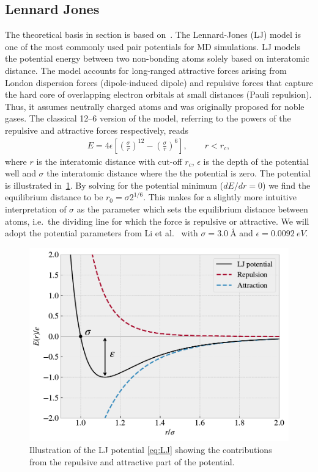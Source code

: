 \subsection{Lennard Jones}\label{sec:LJ}
The theoretical basis in section is based on~\cite{docs_lammps_LJ,
C9CP05445F, chem_libretexts_LJ}. The Lennard-Jones (\acrshort{LJ}) model is one of the most commonly used pair potentials for \acrshort{MD} simulations. \acrshort{LJ} models the potential energy between two non-bonding atoms solely based on interatomic distance. The model accounts for long-ranged attractive forces arising from London dispersion forces (dipole-induced dipole) and repulsive forces that capture the hard core of overlapping electron orbitals at small distances (Pauli repulsion). Thus, it assumes neutrally charged atoms and was originally proposed for noble gases. The classical 12--6 version of the model, referring to the powers of the repulsive and attractive forces respectively, reads
\begin{align}
  E = 4\epsilon \left[\left(\frac{\sigma}{r}\right)^{12} - \left(\frac{\sigma}{r}\right)^6 \right ], \qquad r < r_c,
  \label{eq:LJ}
\end{align}
where $r$ is the interatomic distance with cut-off $r_c$, $\epsilon$ is the
depth of the potential well and $\sigma$ the interatomic distance where the
the potential is zero. The potential is illustrated in~\cref{fig:LJ_pot}. By solving for the potential minimum ($dE/dr = 0$) we find the equilibrium distance to be $r_0 = \sigma 2^{1/6}$. This makes for a slightly more intuitive interpretation of $\sigma$ as the parameter which sets the equilibrium distance between atoms, i.e.\ the dividing line for which the force is repulsive or attractive. We will adopt the potential parameters from Li et al.~\cite{li_evolving_2016} with $\sigma = \SI{3.0}{\text{Å}}$ and $\epsilon = \SI{0.0092}{eV}$.

\begin{figure}[H]
  \centering
  \includegraphics[width=0.6\linewidth]{figures/theory/LJ_pot.pdf}
  \caption{Illustration of the \acrshort{LJ} potential \cref{eq:LJ} showing the contributions from the repulsive and attractive part of the potential.}
  \label{fig:LJ_pot}
\end{figure}


